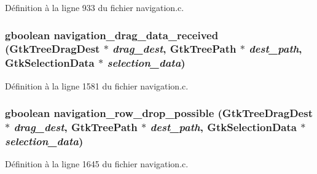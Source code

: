 Définition à la ligne 933 du fichier navigation.c.

\subsubsection[{navigation\_\-drag\_\-data\_\-received}]{\setlength{\rightskip}{0pt plus 5cm}gboolean navigation\_\-drag\_\-data\_\-received (GtkTreeDragDest $\ast$ {\em drag\_\-dest}, \/  GtkTreePath $\ast$ {\em dest\_\-path}, \/  GtkSelectionData $\ast$ {\em selection\_\-data})}\label{navigation_8h_a788a6af93e112548ce10da6c6c6cb9b6}


Définition à la ligne 1581 du fichier navigation.c.

\subsubsection[{navigation\_\-row\_\-drop\_\-possible}]{\setlength{\rightskip}{0pt plus 5cm}gboolean navigation\_\-row\_\-drop\_\-possible (GtkTreeDragDest $\ast$ {\em drag\_\-dest}, \/  GtkTreePath $\ast$ {\em dest\_\-path}, \/  GtkSelectionData $\ast$ {\em selection\_\-data})}\label{navigation_8h_adf246197990d5637d92d86667f1441fa}


Définition à la ligne 1645 du fichier navigation.c.

